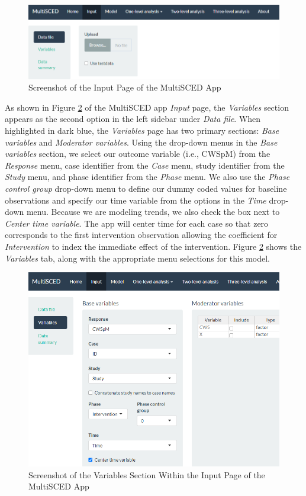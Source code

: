\documentclass[
]{book}
\begin{document}
\begin{figure}
\includegraphics[width=0.6\linewidth]{images/MultiSCED_input.datafile} \caption{Screenshot of the Input Page of the MultiSCED App}\label{fig:MultiSCED-input-dataFile}
\end{figure}

As shown in Figure \ref{fig:MultiSCED-input-variables-Lewandowski} of the MultiSCED app \emph{Input} page, the \emph{Variables} section appears as the second option in the left sidebar under \emph{Data file}. When highlighted in dark blue, the \emph{Variables} page has two primary sections: \emph{Base variables} and \emph{Moderator variables}. Using the drop-down menus in the \emph{Base variables} section, we select our outcome variable (i.e., CWSpM) from the \emph{Response} menu, case identifier from the \emph{Case} menu, study identifier from the \emph{Study} menu, and phase identifier from the \emph{Phase} menu. We also use the \emph{Phase control group} drop-down menu to define our dummy coded values for baseline observations and specify our time variable from the options in the \emph{Time} drop-down menu. Because we are modeling trends, we also check the box next to \emph{Center time variable}. The app will center time for each case so that zero corresponds to the first intervention observation allowing the coefficient for \emph{Intervention} to index the immediate effect of the intervention. Figure \ref{fig:MultiSCED-input-variables-Lewandowski} shows the \emph{Variables} tab, along with the appropriate menu selections for this model.

\begin{figure}
\includegraphics[width=0.6\linewidth]{images/MultiSCED_input.variables_Lewandowski2011} \caption{Screenshot of the Variables Section Within the Input Page of the MultiSCED App}\label{fig:MultiSCED-input-variables-Lewandowski}
\end{figure}
\end{document}
